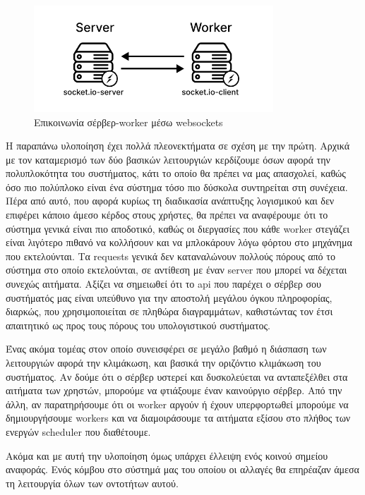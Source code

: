 \begin{figure}[!ht]
	\centering
	\includegraphics[width=0.8\textwidth]{./images/chapter4/socket.io-communication.png}
	\caption[Επικοινωνία σέρβερ-worker μέσω websockets]{Επικοινωνία σέρβερ-worker μέσω websockets}
	\label{fig:socketio-communitation}
\end{figure}

Η παραπάνω υλοποίηση έχει πολλά πλεονεκτήματα σε σχέση με την πρώτη. Αρχικά με τον καταμερισμό
των δύο βασικών λειτουργιών κερδίζουμε όσων αφορά την πολυπλοκότητα του συστήματος, κάτι το οποίο θα πρέπει να μας απασχολεί,
καθώς όσο πιο πολύπλοκο είναι ένα σύστημα τόσο πιο δύσκολα συντηρείται στη συνέχεια. Πέρα από αυτό, που αφορά
κυρίως τη διαδικασία ανάπτυξης λογισμικού και δεν επιφέρει κάποιο άμεσο κέρδος στους χρήστες, θα πρέπει να αναφέρουμε
ότι το σύστημα γενικά είναι πιο αποδοτικό, καθώς οι διεργασίες που κάθε worker στεγάζει είναι λιγότερο πιθανό να
κολλήσουν και να μπλοκάρουν λόγω φόρτου στο μηχάνημα που εκτελούνται. Τα requests γενικά δεν καταναλώνουν πολλούς πόρους από το σύστημα στο οποίο εκτελούνται,
σε αντίθεση με έναν server που μπορεί να δέχεται συνεχώς αιτήματα. Αξίζει να σημειωθεί ότι το api που παρέχει ο σέρβερ σου συστήματός μας είναι υπεύθυνο
για την αποστολή μεγάλου όγκου πληροφορίας, διαρκώς, που χρησιμοποιείται σε πληθώρα διαγραμμάτων, καθιστώντας τον έτσι απαιτητικό ως προς τους πόρους του
υπολογιστικού συστήματος.

Ένας ακόμα τομέας στον οποίο συνεισφέρει σε μεγάλο βαθμό η διάσπαση των λειτουργιών αφορά την κλιμάκωση, και βασικά την οριζόντιο κλιμάκωση
του συστήματος. Αν δούμε ότι ο σέρβερ υστερεί και δυσκολεύεται να ανταπεξέλθει στα αιτήματα των χρηστών,
μπορούμε να φτιάξουμε έναν καινούργιο σέρβερ. Από την άλλη, αν παρατηρήσουμε ότι οι worker αργούν ή έχουν υπερφορτωθεί
μπορούμε να δημιουργήσουμε workers και να διαμοιράσουμε τα αιτήματα εξίσου στο πλήθος των ενεργών scheduler που διαθέτουμε.

\newpage

Ακόμα και με αυτή την υλοποίηση όμως υπάρχει έλλειψη ενός κοινού σημείου αναφοράς. Ενός κόμβου στο σύστημά μας του οποίου
οι αλλαγές θα επηρέαζαν άμεσα τη λειτουργία όλων των οντοτήτων αυτού.


